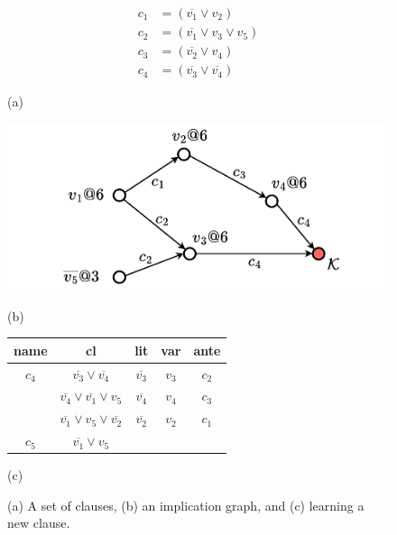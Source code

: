 \documentclass[oneside,11pt,dvipsnames]{book}
\numberwithin{equation}{section}
\theoremstyle{definition}
\theoremstyle{remark}
\begin{document}
\begin{figure}
    \begin{minipage}[c]{0.15\textwidth}
        \centering
        \small
        \begin{equation*}
            \begin{aligned}
                c_1 &= (\overline{v_1} \lor v_2) \\
                c_2 &= (\overline{v_1} \lor v_3 \lor v_5) \\
                c_3 &= (\overline{v_2} \lor v_4) \\
                c_4 &= (\overline{v_3} \lor \overline{v_4})
            \end{aligned}
        \end{equation*}
        \caption*{(a)}
    \end{minipage}
    \begin{minipage}[c]{0.40\textwidth}
        \centering
        \includegraphics[width=1\linewidth]{figure/implication_graph.pdf}
        \caption*{(b)}
    \end{minipage}
    \begin{minipage}[c]{0.33\textwidth}
        \centering
        \footnotesize
        \begin{tabular}{ccccc}
            name & cl & lit & var & ante \\
            \midrule
            $c_4$ &$\overline{v_3} \lor \overline{v_4}$   & $\overline{v_3}$ &$v_3$   &     $c_2$\\
            & $\overline{v_4} \lor \overline{v_1} \lor v_5$  & $\overline{v_4}$   &     $v_4$  &      $c_3$\\
            &$\overline{v_1} \lor v_5 \lor \overline{v_2}$   & $\overline{v_2}$   &     $v_2$  &      $c_1$\\
            $c_5$      & $\overline{v_1} \lor v_5$
        \end{tabular}
        \caption*{(c)}
    \end{minipage}
    \caption{(a) A set of clauses, (b) an implication graph, and (c) learning a new clause.\label{fig:igraph}}
\end{figure}
\end{document}
